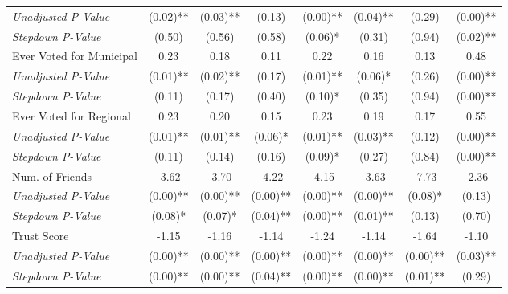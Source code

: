 \begin{tabular}{l c c c c c c c}
\quad \textit{Unadjusted P-Value} & (0.02)** & (0.03)** & (0.13) & (0.00)** & (0.04)** & (0.29) & (0.00)** \\
\quad \textit{Stepdown P-Value} & (0.50) & (0.56) & (0.58) & (0.06)* & (0.31) & (0.94) & (0.02)** \\
Ever Voted for Municipal & 0.23 & 0.18 & 0.11 & 0.22 & 0.16 & 0.13 & 0.48 \\
\quad \textit{Unadjusted P-Value} & (0.01)** & (0.02)** & (0.17) & (0.01)** & (0.06)* & (0.26) & (0.00)** \\
\quad \textit{Stepdown P-Value} & (0.11) & (0.17) & (0.40) & (0.10)* & (0.35) & (0.94) & (0.00)** \\
Ever Voted for Regional & 0.23 & 0.20 & 0.15 & 0.23 & 0.19 & 0.17 & 0.55 \\
\quad \textit{Unadjusted P-Value} & (0.01)** & (0.01)** & (0.06)* & (0.01)** & (0.03)** & (0.12) & (0.00)** \\
\quad \textit{Stepdown P-Value} & (0.11) & (0.14) & (0.16) & (0.09)* & (0.27) & (0.84) & (0.00)** \\
Num. of Friends & -3.62 & -3.70 & -4.22 & -4.15 & -3.63 & -7.73 & -2.36 \\
\quad \textit{Unadjusted P-Value} & (0.00)** & (0.00)** & (0.00)** & (0.00)** & (0.00)** & (0.08)* & (0.13) \\
\quad \textit{Stepdown P-Value} & (0.08)* & (0.07)* & (0.04)** & (0.00)** & (0.01)** & (0.13) & (0.70) \\
Trust Score & -1.15 & -1.16 & -1.14 & -1.24 & -1.14 & -1.64 & -1.10 \\
\quad \textit{Unadjusted P-Value} & (0.00)** & (0.00)** & (0.00)** & (0.00)** & (0.00)** & (0.00)** & (0.03)** \\
\quad \textit{Stepdown P-Value} & (0.00)** & (0.00)** & (0.04)** & (0.00)** & (0.00)** & (0.01)** & (0.29) \\
\bottomrule
\end{tabular}
